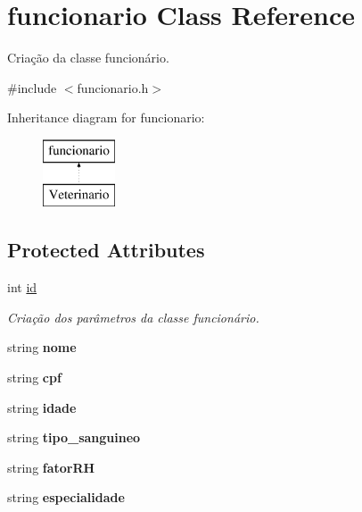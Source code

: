 \hypertarget{classfuncionario}{}\section{funcionario Class Reference}
\label{classfuncionario}


Criação da classe funcionário.  




{\ttfamily \#include $<$funcionario.\+h$>$}

Inheritance diagram for funcionario\+:\begin{figure}[H]
\begin{center}
\leavevmode
\includegraphics[height=2.000000cm]{classfuncionario}
\end{center}
\end{figure}
\subsection*{Protected Attributes}
\begin{DoxyCompactItemize}
\item 
int \mbox{\hyperlink{classfuncionario_ad48715f6be92d7cf934b0dd51c8ee42e}{id}}
\begin{DoxyCompactList}\small\item\em Criação dos parâmetros da classe funcionário. \end{DoxyCompactList}\item 
\mbox{\label{classfuncionario_a22abef9e62c546e487df049df90cf0ef}} 
string {\bfseries nome}
\item 
\mbox{\label{classfuncionario_a25ecd173967565446dbe936ce193d702}} 
string {\bfseries cpf}
\item 
\mbox{\label{classfuncionario_a451f9d7e02bc1eac8255ef79daad15ba}} 
string {\bfseries idade}
\item 
\mbox{\label{classfuncionario_abedbfcc85cf879c4c6d703c3a0adfb99}} 
string {\bfseries tipo\+\_\+sanguineo}
\item 
\mbox{\label{classfuncionario_a47d9fec23a2e4b83f451c4e6752e9966}} 
string {\bfseries fator\+RH}
\item 
\mbox{\label{classfuncionario_a67256822db99e87eb331edac90ab19bd}} 
string {\bfseries especialidade}
\end{DoxyCompactItemize}


